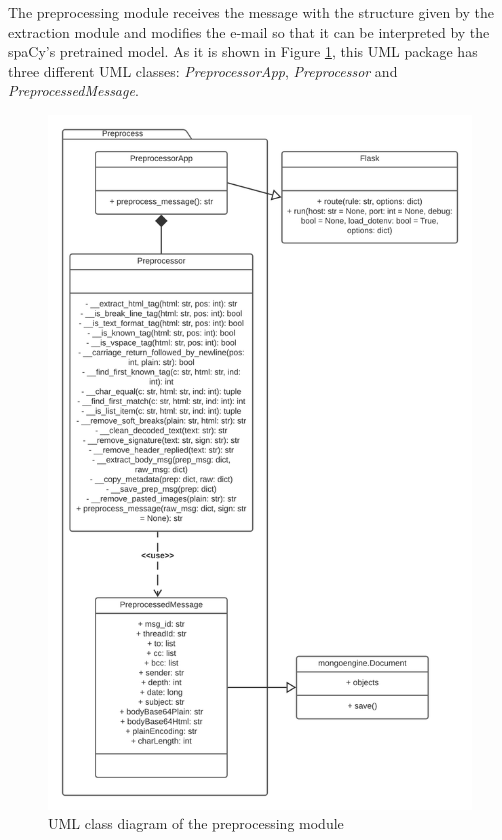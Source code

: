 The preprocessing module receives the message with the structure given by the extraction module and modifies the e-mail so that it can be interpreted by the spaCy's pretrained model. As it is shown in Figure \ref{fig:umlprep}, this UML package has three different UML classes: \textit{PreprocessorApp}, \textit{Preprocessor} and \textit{PreprocessedMessage}.

\begin{figure}[p]
	\centering%
	\centerline{\includegraphics[height=0.8\paperheight]{Imagenes/Bitmap/Analyser/preprocessUML.png}}%
	\caption{UML class diagram of the preprocessing module}%
	\label{fig:umlprep}
\end{figure}

